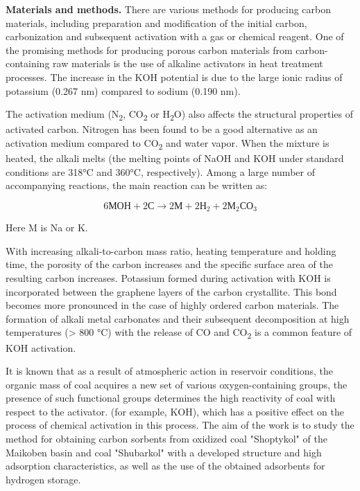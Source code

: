 {\bfseries Materials and methods.} There are various methods for producing
carbon materials, including preparation and modification of the initial
carbon, carbonization and subsequent activation with a gas or chemical
reagent. One of the promising methods for producing porous carbon
materials from carbon-containing raw materials is the use of alkaline
activators in heat treatment processes. The increase in the KOH
potential is due to the large ionic radius of potassium (0.267 nm)
compared to sodium (0.190 nm).

The activation medium (N\textsubscript{2}, CO\textsubscript{2} or
H\textsubscript{2}O) also affects the structural properties of activated
carbon. Nitrogen has been found to be a good alternative as an
activation medium compared to CO\textsubscript{2} and water vapor. When
the mixture is heated, the alkali melts (the melting points of NaOH and
KOH under standard conditions are 318°C and 360°C, respectively). Among
a large number of accompanying reactions, the main reaction can be
written as:

\[6МОН + 2С \rightarrow 2М + 2Н_{2} + 2М_{2}СО_{3}\]

Here M is Na or K.

With increasing alkali-to-carbon mass ratio, heating temperature and
holding time, the porosity of the carbon increases and the specific
surface area of \hspace{0pt}\hspace{0pt}the resulting carbon increases.
Potassium formed during activation with KOH is incorporated between the
graphene layers of the carbon crystallite. This bond becomes more
pronounced in the case of highly ordered carbon materials. The formation
of alkali metal carbonates and their subsequent decomposition at high
temperatures (\textgreater{} 800 °C) with the release of CO and
CO\textsubscript{2} is a common feature of KOH activation.

It is known that as a result of atmospheric action in reservoir
conditions, the organic mass of coal acquires a new set of various
oxygen-containing groups, the presence of such functional groups
determines the high reactivity of coal with respect to the activator.
(for example, KOH), which has a positive effect on the process of
chemical activation in this process. The aim of the work is to study the
method for obtaining carbon sorbents from oxidized coal "Shoptykol" of
the Maikoben basin and coal "Shubarkol" with a developed structure and
high adsorption characteristics, as well as the use of the obtained
adsorbents for hydrogen storage.

